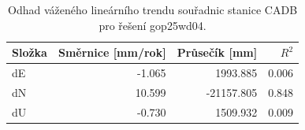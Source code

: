 \begin{table}[htbp]
\caption{Odhad váženého lineárního trendu souřadnic stanice CADB pro řešení gop25wd04.}
\label{tab:gop25wd04_stcd_cadb_weighted_1seg}
\begin{tabular}{lrrr}
\toprule
Složka & Směrnice [mm/rok] & Průsečík [mm] & $R^2$ \\
\midrule
dE & -1.065 & 1993.885 & 0.006 \\
dN & 10.599 & -21157.805 & 0.848 \\
dU & -0.730 & 1509.932 & 0.009 \\
\bottomrule
\end{tabular}
\end{table}
